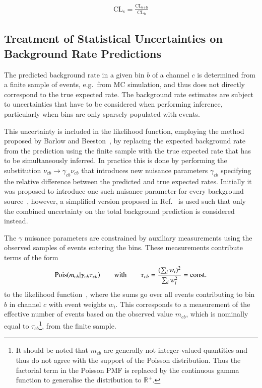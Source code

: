 \begin{align}
  \text{CL}_\text{s} = \frac{\text{CL}_\text{s+b}}{\text{CL}_\text{b}}
\end{align}


\subsection{Treatment of Statistical Uncertainties on Background Rate
  Predictions}%
\label{sec:barlow_beeston}

The predicted background rate in a given bin $b$ of a channel $c$ is
determined from a finite sample of events, e.g.\ from MC simulation,
and thus does not directly correspond to the true expected rate. The
background rate estimates are subject to uncertainties that have to be
considered when performing inference, particularly when bins are only
sparsely populated with events.

This uncertainty is included in the likelihood function, employing the
method proposed by Barlow and Beeston~\cite{barlow1993}, by replacing
the expected background rate from the prediction using the finite
sample with the true expected rate that has to be simultaneously
inferred. In practice this is done by performing the substitution
$\nu_{cb} \rightarrow \gamma_{cb} \nu_{cb}$ that introduces new
nuisance parameters $\gamma_{cb}$ specifying the relative difference
between the predicted and true expected rates. Initially it was
proposed to introduce one such nuisance parameter for every background
source~\cite{barlow1993}, however, a simplified version proposed in
Ref.~\cite{conway2011} is used such that only the combined uncertainty
on the total background prediction is considered instead.

The $\gamma$ nuisance parameters are constrained by auxiliary
measurements using the observed samples of events entering the
bins. These measurements contribute terms of the form
\begin{align*}
  \operatorname{Pois}(m_{cb} | \gamma_{cb} \tau_{cb})
  \qquad \text{with} \qquad
  \tau_{cb} = \frac{( \sum_i w_i )^2}{\sum_i w_i^2} = \text{const.}
\end{align*}
to the likelihood function~\cite{cranmer2012}, where the sums go over
all events contributing to bin $b$ in channel $c$ with event weights
$w_i$. This corresponds to a measurement of the effective number of
events based on the observed value $m_{cb}$, which is nominally equal
to $\tau_{cb}$\footnote{It should be noted that $m_{cb}$ are generally
  not integer-valued quantities and thus do not agree with the support
  of the Poisson distribution. Thus the factorial term in the Poisson
  PMF is replaced by the continuous gamma function to generalise the
  distribution to $\mathbb{R}^+$.}, from the finite sample.

